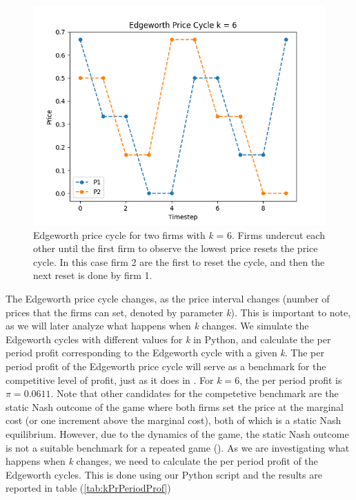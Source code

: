 \documentclass{article}
\begin{document}
\begin{figure}[H]
    \centering
    \includegraphics[scale = 0.75]{Edgeworth price cycle k = 6.png}
    \caption{Edgeworth price cycle for two firms with \textit{k} = 6. Firms undercut each other until the first firm to observe the lowest price resets the price cycle. In this case firm 2 are the first to reset the cycle, and then the next reset is done by firm 1.}
    \label{fig:EdgeworthCycle}
\end{figure}
The Edgeworth price cycle changes, as the price interval changes (number of prices that the firms can set, denoted by parameter \textit{k}). This is important to note, as we will later analyze what happens when \textit{k} changes. 
\newline
We simulate the Edgeworth cycles with different values for \textit{k} in Python, and calculate the per period profit corresponding to the Edgeworth cycle with a given \textit{k}.
The per period profit of the Edgeworth price cycle will serve as a benchmark for the competitive level of profit, just as it does in \cite{Klein2021}. For $k = 6$, the per period profit is $\pi = 0.0611$. Note that other candidates for the competetive benchmark are the static Nash outcome of the game where both firms set the price at the marginal cost (or one increment above the marginal cost), both of which is a static Nash equilibrium. However, due to the dynamics of the game, the static Nash outcome is not a suitable benchmark for a repeated game (\cite{Klein2021}).
\newline
As we are investigating what happens when \textit{k} changes, we need to calculate the per period profit of the Edgeworth cycles. This is done using our Python script and the results are reported in table (\ref{tab:kPrPeriodProf})
\end{document}
